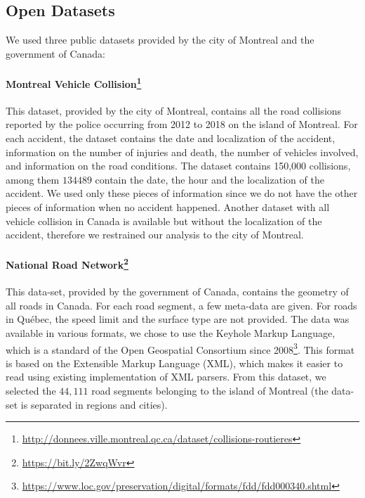 \documentclass[conference]{IEEEtran}
\begin{document}
\subsection{Open Datasets}
\label{sec:datasets}

We used three public datasets provided by the city of Montreal and the government of Canada: 

\paragraph{Montreal Vehicle Collision\protect\footnote{\url{http://donnees.ville.montreal.qc.ca/dataset/collisions-routieres}}}

This dataset, provided by the city of Montreal, contains all the road
collisions reported by the police occurring from 2012 to 2018 on the island
of Montreal. For each accident, the dataset contains the date and
localization of the accident, information on the number of injuries and
death, the number of vehicles involved, and information on the road
conditions. The dataset contains 150,000 collisions, among them $134 489$
contain the date, the hour and the localization of the accident. We used
only these pieces of information since we do not have the other pieces
of information when no accident happened.
Another dataset with all vehicle collision in Canada is available but
without the localization of the accident, therefore we restrained our
analysis to the city of Montreal.

\paragraph{National Road Network\protect\footnote{\url{https://bit.ly/2ZwqWvr}}}

This data-set, provided by the government of Canada, contains the geometry of
all roads in Canada. For each road segment, a few meta-data are given. For
roads in Québec, the speed limit and the surface type are not provided. The
data was available in various formats, we chose to use the Keyhole Markup
Language, which is a standard of the Open Geospatial Consortium since 2008\protect\footnote{\url{https://www.loc.gov/preservation/digital/formats/fdd/fdd000340.shtml}}. 
This format is based on the Extensible Markup Language (XML), which makes it
easier to read using existing implementation of XML parsers. From this
dataset, we selected the $44,111$ road segments belonging to the island of
Montreal (the data-set is separated in regions and cities).
\end{document}
